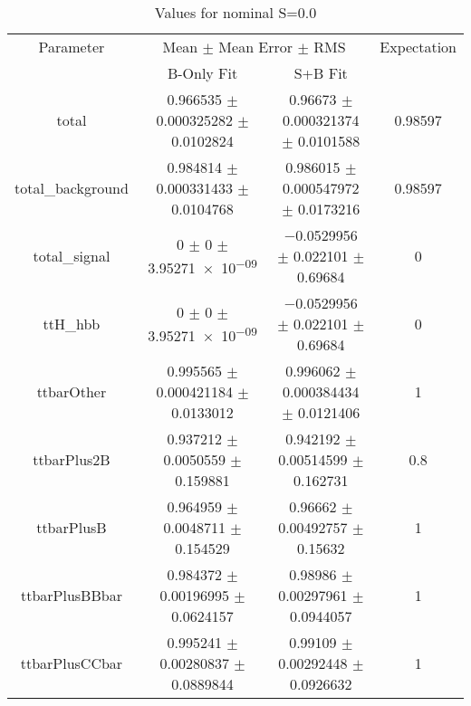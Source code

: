 \begin{table}
\centering
\caption{Values for nominal S=0.0}
\begin{tabular}{cccc}
\toprule
Parameter & \multicolumn{2}{c}{Mean $\pm$ Mean Error $\pm$ RMS} & Expectation\\
 & B-Only Fit & S+B Fit & \\
\midrule
total & \num{0.966535} $\pm$ \num{0.000325282} $\pm$ \num{0.0102824} & \num{0.96673} $\pm$ \num{0.000321374} $\pm$ \num{0.0101588} & \num{0.98597}\\
total\_background & \num{0.984814} $\pm$ \num{0.000331433} $\pm$ \num{0.0104768} & \num{0.986015} $\pm$ \num{0.000547972} $\pm$ \num{0.0173216} & \num{0.98597}\\
total\_signal & \num{0} $\pm$ \num{0} $\pm$ \num{3.95271e-09} & \num{-0.0529956} $\pm$ \num{0.022101} $\pm$ \num{0.69684} & \num{0}\\
ttH\_hbb & \num{0} $\pm$ \num{0} $\pm$ \num{3.95271e-09} & \num{-0.0529956} $\pm$ \num{0.022101} $\pm$ \num{0.69684} & \num{0}\\
ttbarOther & \num{0.995565} $\pm$ \num{0.000421184} $\pm$ \num{0.0133012} & \num{0.996062} $\pm$ \num{0.000384434} $\pm$ \num{0.0121406} & \num{1}\\
ttbarPlus2B & \num{0.937212} $\pm$ \num{0.0050559} $\pm$ \num{0.159881} & \num{0.942192} $\pm$ \num{0.00514599} $\pm$ \num{0.162731} & \num{0.8}\\
ttbarPlusB & \num{0.964959} $\pm$ \num{0.0048711} $\pm$ \num{0.154529} & \num{0.96662} $\pm$ \num{0.00492757} $\pm$ \num{0.15632} & \num{1}\\
ttbarPlusBBbar & \num{0.984372} $\pm$ \num{0.00196995} $\pm$ \num{0.0624157} & \num{0.98986} $\pm$ \num{0.00297961} $\pm$ \num{0.0944057} & \num{1}\\
ttbarPlusCCbar & \num{0.995241} $\pm$ \num{0.00280837} $\pm$ \num{0.0889844} & \num{0.99109} $\pm$ \num{0.00292448} $\pm$ \num{0.0926632} & \num{1}\\
\bottomrule
\end{tabular}
\end{table}